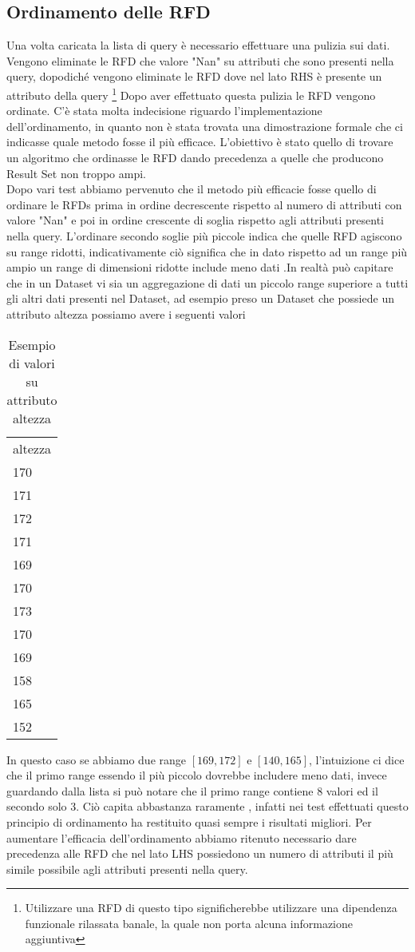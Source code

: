 \subsection{Ordinamento delle RFD}
Una volta caricata la lista di query è necessario effettuare una pulizia sui dati.
Vengono eliminate le RFD che valore "Nan" su attributi che sono presenti nella query, dopodiché vengono eliminate le RFD dove nel lato RHS è presente un attributo della query \footnote{Utilizzare una RFD di questo tipo significherebbe utilizzare una dipendenza funzionale rilassata banale, la quale non porta alcuna informazione aggiuntiva}
Dopo aver effettuato questa pulizia le RFD vengono ordinate. 
\newline
C'è stata molta indecisione riguardo l'implementazione dell'ordinamento, in quanto non è stata trovata una dimostrazione formale che ci indicasse quale metodo fosse il più efficace.
L'obiettivo è stato quello di trovare un algoritmo che ordinasse le RFD dando precedenza a quelle che producono Result Set non troppo ampi.
\\
Dopo vari test abbiamo pervenuto che il metodo più efficacie fosse quello di ordinare le RFDs prima in ordine decrescente rispetto al numero di attributi con valore "Nan" e poi in ordine crescente di soglia rispetto agli attributi presenti nella query. 
L'ordinare secondo soglie più piccole indica che quelle RFD agiscono su range ridotti, indicativamente ciò significa che in dato rispetto ad un range più ampio un range di dimensioni ridotte include meno dati .In realtà può capitare che in un Dataset vi sia un aggregazione di dati un piccolo range superiore a tutti gli altri dati presenti nel Dataset, ad esempio preso un Dataset che possiede un attributo altezza possiamo avere i seguenti valori
\begin{table}[h]
    \centering
    \begin{tabular}{l }
    altezza \\
    170 \\
    171 \\
    172 \\
    171 \\
    169 \\
    170 \\
    173 \\
    170 \\
    169 \\
    158 \\
    165 \\
    152 \\
    \end{tabular}
    \caption{Esempio di valori su attributo altezza}
    \label{tab:abc}
\end{table}
In questo caso se abbiamo due range $[169,172]$ e $[140,165]$, l'intuizione ci dice che il primo range essendo il più piccolo dovrebbe includere meno dati, invece guardando dalla lista si può notare che il primo range contiene 8 valori ed il secondo solo 3.
Ciò capita abbastanza raramente , infatti nei test effettuati questo principio di ordinamento ha restituito quasi sempre i risultati migliori.
Per aumentare l'efficacia dell'ordinamento abbiamo ritenuto necessario dare precedenza alle RFD che nel lato LHS possiedono un numero di attributi il più simile possibile agli attributi presenti nella query.